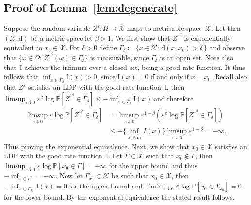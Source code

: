 \documentclass{amsart}[11pt]
\numberwithin{equation}{section}
\numberwithin{theorem}{subsection}
\numberwithin{proposition}{subsection}
\numberwithin{definition}{subsection}
\numberwithin{lemma}{subsection}
\numberwithin{assumption}{subsection}
\newcommand{\Xx}{\mathcal{X}}
\newcommand{\PP}{\mathbb{P}}
\newcommand{\II}{\mathrm{I}}
\newcommand{\eps}{\varepsilon}
\begin{document}
\subsection{Proof of Lemma~\ref{lem:degenerate}}\label{sec:lem:degenerate_Proof}
Suppose the random variable $Z^\eps:\Omega\rightarrow \Xx$ maps to metrisable space~$\Xx$. Let then $(\Xx, \mathrm{d})$ be a metric space let $\beta > 1$. We first show that $Z^{\eps^\beta}$ is exponentially equivalent to $x_0\in \Xx$. For $\delta > 0$ define $\Gamma_{\delta} \coloneqq \{x \in \Xx : \, \mathrm{d}(x,x_0)>\delta \, \}$ and observe that $\{\omega \in \Omega : \, Z^{\eps^\beta}(\omega)\in\Gamma_\delta\}$ is measurable, since $\Gamma_\delta$ is an open set. Note also that~$\II$ achieves the infimum over a closed set, being a good rate function. It thus follows that $\inf_{x\in\overline{\Gamma}_\delta} \II(x) > 0$, since $\II(x)=0$ if and only if $x=x_0$. Recall also that $Z^\eps$ satisfies an LDP with the good rate function~$\II$, then $\limsup_{\eps\downarrow 0}\eps^\beta\log\PP\left[ Z^{\eps^\beta} \in \Gamma_\delta \right] \leq - \inf_{x\in\overline{\Gamma}_\delta}\II(x)$ and therefore
\begin{align*}
\limsup_{\eps\downarrow 0} \eps \log \PP \left[ Z^{\eps^\beta} \in \Gamma_\delta \right] &= \limsup_{\eps\downarrow 0} \eps^{1-\beta}\left(\eps^\beta \log \PP \left[ Z^{\eps^\beta} \in \Gamma_\delta \right]\right) \\
&\leq -\bigg\{ \inf_{x\in\overline{\Gamma}_\delta} I(x)\bigg\} \limsup_{\eps\downarrow 0}\eps^{1-\beta} = -\infty.
\end{align*}
Thus proving the exponential equivalence. Next, we show that $x_0\in\Xx$ satisfies an LDP with the good rate function~$\II$. Let $\Gamma\subset\Xx$ such that $x_0\notin\Gamma$, then $\limsup_{\eps\downarrow 0} \eps \log \PP[x_0\in\Gamma]=-\infty$ for the upper bound and thus $-\inf_{x\in\Gamma^\circ}=-\infty$. Now let $\Gamma_{x_0}\subset\Xx$ be such that $x_0\in\Xx$, then $-\inf_{x\in\Gamma_{x_0}} \II(x)=0$ for the upper bound and $\liminf_{\eps\downarrow 0}\eps \log \PP[x_0\in\Gamma_{x_0}]=0$ for the lower bound. By the exponential equivalence the stated result follows.

\end{document}
